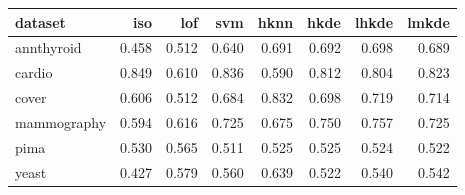 \begin{tabular}{l|rrr|rrrr}
  \toprule
dataset & iso & lof & svm & hknn & hkde & lhkde & lmkde \\ 
  \midrule
annthyroid & 0.458 & 0.512 & 0.640 & 0.691 & 0.692 & 0.698 & 0.689 \\ 
  cardio & 0.849 & 0.610 & 0.836 & 0.590 & 0.812 & 0.804 & 0.823 \\ 
  cover & 0.606 & 0.512 & 0.684 & 0.832 & 0.698 & 0.719 & 0.714 \\ 
  mammography & 0.594 & 0.616 & 0.725 & 0.675 & 0.750 & 0.757 & 0.725 \\ 
  pima & 0.530 & 0.565 & 0.511 & 0.525 & 0.525 & 0.524 & 0.522 \\ 
  yeast & 0.427 & 0.579 & 0.560 & 0.639 & 0.522 & 0.540 & 0.542 \\ 
   \bottomrule
\end{tabular}
